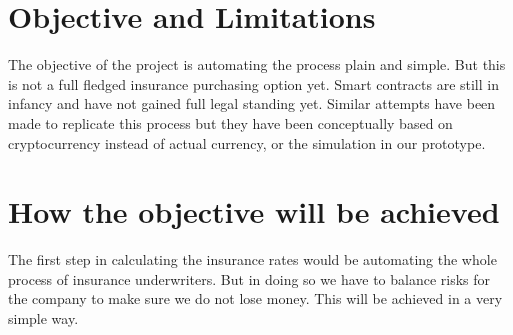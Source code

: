 \section{Objective and Limitations}
The objective of the project is automating the process plain and simple. But this is not a full fledged insurance purchasing option yet. Smart contracts are still in infancy and have not gained full legal standing yet. Similar attempts have been made to replicate this process but they have been conceptually based on cryptocurrency instead of actual currency, or the simulation in our prototype.

\section{How the objective will be achieved}
The first step in calculating the insurance rates would be automating the whole process of insurance underwriters. But in doing so we have to balance risks for the company to make sure we do not lose money. This will be achieved in a very simple way.
